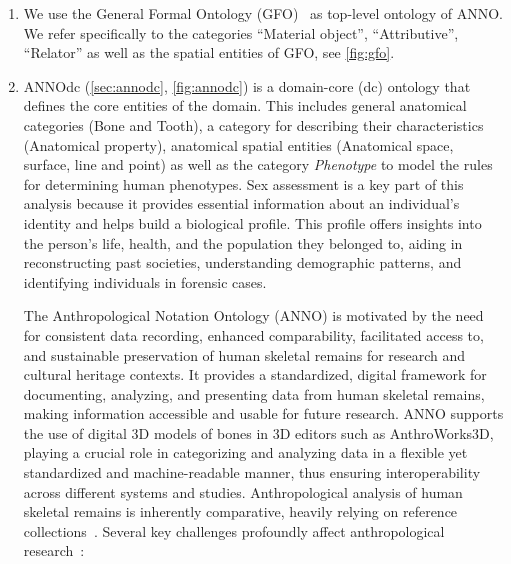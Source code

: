 \documentclass[sw]{iosart2x}
\begin{document}
\begin{enumerate}
\item We use the General Formal Ontology (GFO)~\citep{gfo} as top-level ontology of ANNO.
We refer specifically to the categories \enquote{Material object}, \enquote{Attributive}, \enquote{Relator} as well as the spatial entities of GFO, see \cref{fig:gfo}. %

\item ANNOdc (\cref{sec:annodc}, \cref{fig:annodc}) is a domain-core (dc) ontology that defines the core entities of the domain.
This includes general anatomical categories (Bone and Tooth), a category for describing their characteristics (Anatomical property), anatomical spatial entities (Anatomical space, surface, line and point) as well as the category \emph{Phenotype} to model the rules for determining human phenotypes.
Sex assessment is a key part of this analysis because it provides essential information about an individual's identity and helps build a biological profile.
This profile offers insights into the person's life, health, and the population they belonged to, aiding in reconstructing past societies, understanding demographic patterns, and identifying individuals in forensic cases.

The Anthropological Notation Ontology (ANNO) is motivated by the need for consistent data recording, enhanced comparability, facilitated access to, and sustainable preservation of human skeletal remains for research and cultural heritage contexts.
It provides a standardized, digital framework for documenting, analyzing, and presenting data from human skeletal remains, making information accessible and usable for future research.
ANNO supports the use of digital 3D models of bones in 3D editors such as AnthroWorks3D, playing a crucial role in categorizing and analyzing data in a flexible yet standardized and machine-readable manner, thus ensuring interoperability across different systems and studies.
Anthropological analysis of human skeletal remains is inherently comparative, heavily relying on reference collections~\citep{spurensuche}.
Several key challenges profoundly affect anthropological research~\citep{aw3dcidoc}:


\end{enumerate}
\end{document}
